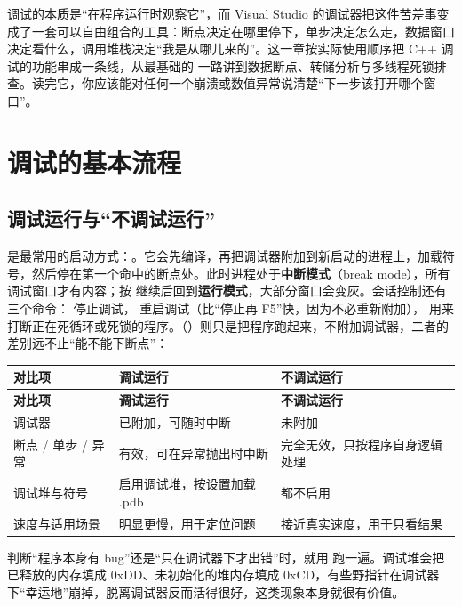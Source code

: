 
调试的本质是“在程序运行时观察它”，而 Visual Studio 的调试器把这件苦差事变成了一套可以自由组合的工具：断点决定在哪里停下，单步决定怎么走，数据窗口决定看什么，调用堆栈决定“我是从哪儿来的”。这一章按实际使用顺序把 C++ 调试的功能串成一条线，从最基础的  一路讲到数据断点、转储分析与多线程死锁排查。读完它，你应该能对任何一个崩溃或数值异常说清楚“下一步该打开哪个窗口”。

\section{调试的基本流程}

\subsection{调试运行与“不调试运行”}

 是最常用的启动方式：。它会先编译，再把调试器附加到新启动的进程上，加载符号，然后停在第一个命中的断点处。此时进程处于\textbf{中断模式}（break mode），所有调试窗口才有内容；按  继续后回到\textbf{运行模式}，大部分窗口会变灰。会话控制还有三个命令： 停止调试， 重启调试（比“停止再 F5”快，因为不必重新附加）， 用来打断正在死循环或死锁的程序。（）则只是把程序跑起来，不附加调试器，二者的差别远不止“能不能下断点”：

\begin{longtable}{L{3.0cm}L{5.8cm}L{5.8cm}}\toprule
\textbf{对比项} & \textbf{ 调试运行} & \textbf{ 不调试运行} \\ \midrule \endfirsthead
\toprule \textbf{对比项} & \textbf{ 调试运行} & \textbf{ 不调试运行} \\ \midrule \endhead \bottomrule \endlastfoot
调试器 & 已附加，可随时中断 & 未附加 \\
断点 / 单步 / 异常 & 有效，可在异常抛出时中断 & 完全无效，只按程序自身逻辑处理 \\
调试堆与符号 & 启用调试堆，按设置加载 .pdb & 都不启用 \\
速度与适用场景 & 明显更慢，用于定位问题 & 接近真实速度，用于只看结果 \\
\end{longtable}
\begin{tipbox}[提示]
判断“程序本身有 bug”还是“只在调试器下才出错”时，就用  跑一遍。调试堆会把已释放的内存填成 0xDD、未初始化的堆内存填成 0xCD，有些野指针在调试器下“幸运地”崩掉，脱离调试器反而活得很好，这类现象本身就很有价值。
\end{tipbox}

